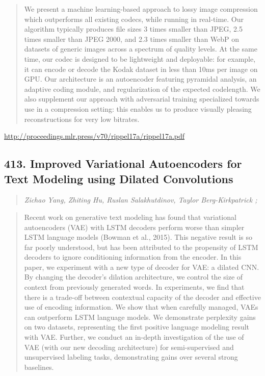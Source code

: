 \documentclass{article}
\begin{document}
\begin{quote}
    We present a machine learning-based approach to lossy image compression which outperforms all existing codecs, while running in real-time. Our algorithm typically produces file sizes 3 times smaller than JPEG, 2.5 times smaller than JPEG 2000, and 2.3 times smaller than WebP on datasets of generic images across a spectrum of quality levels. At the same time, our codec is designed to be lightweight and deployable: for example, it can encode or decode the Kodak dataset in less than 10ms per image on GPU. Our architecture is an autoencoder featuring pyramidal analysis, an adaptive coding module, and regularization of the expected codelength. We also supplement our approach with adversarial training specialized towards use in a compression setting: this enables us to produce visually pleasing reconstructions for very low bitrates.  
\end{quote}

\href{http://proceedings.mlr.press/v70/rippel17a/rippel17a.pdf}{http://proceedings.mlr.press/v70/rippel17a/rippel17a.pdf}

\subsection{413. Improved Variational Autoencoders for Text Modeling using Dilated Convolutions}

\begin{quote}
\footnotesize{\textit{Zichao Yang, Zhiting Hu, Ruslan Salakhutdinov, Taylor Berg-Kirkpatrick ;}}

\end{quote}

\begin{quote}
    Recent work on generative text modeling has found that variational autoencoders (VAE) with LSTM decoders perform worse than simpler LSTM language models (Bowman et al., 2015). This negative result is so far poorly understood, but has been attributed to the propensity of LSTM decoders to ignore conditioning information from the encoder. In this paper, we experiment with a new type of decoder for VAE: a dilated CNN. By changing the decoder’s dilation architecture, we control the size of context from previously generated words. In experiments, we find that there is a trade-off between contextual capacity of the decoder and effective use of encoding information. We show that when carefully managed, VAEs can outperform LSTM language models. We demonstrate perplexity gains on two datasets, representing the first positive language modeling result with VAE. Further, we conduct an in-depth investigation of the use of VAE (with our new decoding architecture) for semi-supervised and unsupervised labeling tasks, demonstrating gains over several strong baselines.  
\end{quote}
\end{document}

